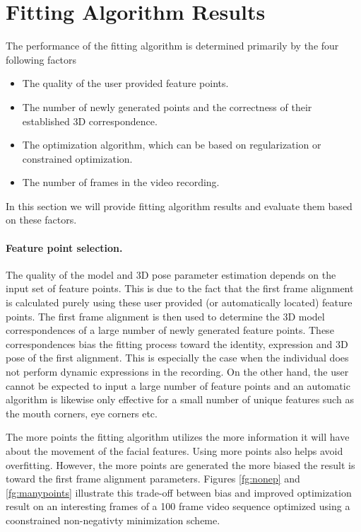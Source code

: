 \documentclass[11pt,a4paper,twoside]{report}
\begin{document}
\section{Fitting Algorithm Results}
The performance of the fitting algorithm is determined primarily by the four
following factors
\begin{itemize}
\item The quality of the user provided feature points.
\item The number of newly generated points and the correctness of their
  established 3D correspondence.
\item The optimization algorithm, which can be based on regularization or
  constrained optimization.
\item The number of frames in the video recording.
\end{itemize}
In this section we will provide fitting algorithm results and evaluate them
based on these factors.
\paragraph{Feature point selection.}
The quality of the model and 3D pose parameter estimation depends on the input set of feature points. This is due to the fact that the first frame
alignment is calculated purely using these user provided (or automatically
located) feature points. The first frame alignment is then used to determine the
3D model correspondences of a
large number of newly generated feature points. These correspondences bias the
fitting process toward the identity, expression and 3D pose of the first
alignment. This is especially the case when the individual does not perform
dynamic expressions in the recording. On the other hand, the user cannot be expected to input a large number of
feature points and an automatic algorithm is likewise only effective for a small
number of unique features such as the mouth corners, eye corners etc. 

The more points the fitting algorithm utilizes the more information it will have about the
movement of the facial features. Using more points also helps avoid
overfitting. However, the more points are generated the more biased the result
is toward the first frame alignment parameters. Figures
\ref{fg:nonep} and \ref{fg:manypoints} illustrate this trade-off between bias
and improved optimization result on an interesting frames of a 100 frame video
sequence optimized using a coonstrained non-negativty minimization scheme.
\end{document}

